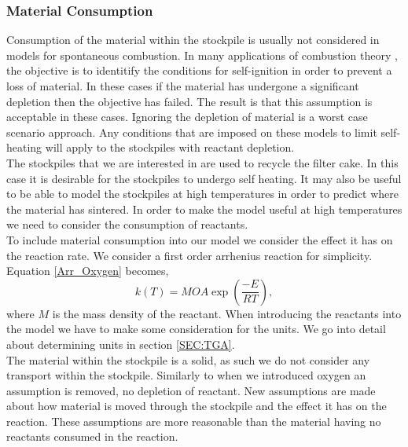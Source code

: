 \subsubsection{Material Consumption}
Consumption of the material within the stockpile is usually not considered in models for spontaneous combustion. In many applications of combustion theory \cite{Zhang16, NELS03,RESTUCCIA17}, the objective is to identitify the conditions for self-ignition in order to prevent a loss of material. In these cases if the material has undergone a significant depletion then the objective has failed. The result is that this assumption is acceptable in these cases. Ignoring the depletion of material is a worst case scenario approach. Any conditions that are imposed on these models to limit self-heating will apply to the stockpiles with reactant depletion.\\
The stockpiles that we are interested in are used to recycle the filter cake. In this case it is desirable for the stockpiles to undergo self heating. It may also be useful to be able to model the stockpiles at high temperatures in order to predict where the material has sintered. In order to make the model useful at high temperatures we need to consider the consumption of reactants.\\
To include material consumption into our model we consider the effect it has on the reaction rate. We consider a first order arrhenius reaction for simplicity. Equation \ref{Arr_Oxygen} becomes,
\begin{equation}
k(T)=MOA\exp\left(\frac{-E}{RT}\right), \label{Arr_Mat}
\end{equation}
where $M$ is the mass density of the reactant. When introducing the reactants into the model we have to make some consideration for the units. We go into detail about determining units in section \ref{SEC:TGA}.\\
The material within the stockpile is a solid, as such we do not consider any transport within the stockpile. Similarly to when we introduced oxygen an assumption is removed, no depletion of reactant. New assumptions are made about how material is moved through the stockpile and the effect it has on the reaction. These assumptions are more reasonable than the material having no reactants consumed in the reaction.\\


